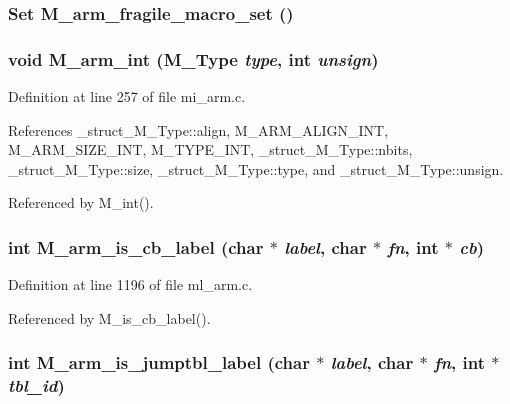 \subsubsection{\setlength{\rightskip}{0pt plus 5cm}\bf{Set} M\_\-arm\_\-fragile\_\-macro\_\-set ()}\label{m__arm_8h_b0a8dfa239893fe6ecf94e3e939766c8}


\subsubsection{\setlength{\rightskip}{0pt plus 5cm}void M\_\-arm\_\-int (\bf{M\_\-Type} {\em type}, int {\em unsign})}\label{m__arm_8h_f9432df5507a52b86271287d4723b72c}




Definition at line 257 of file mi\_\-arm.c.

References \_\-struct\_\-M\_\-Type::align, M\_\-ARM\_\-ALIGN\_\-INT, M\_\-ARM\_\-SIZE\_\-INT, M\_\-TYPE\_\-INT, \_\-struct\_\-M\_\-Type::nbits, \_\-struct\_\-M\_\-Type::size, \_\-struct\_\-M\_\-Type::type, and \_\-struct\_\-M\_\-Type::unsign.

Referenced by M\_\-int().
\subsubsection{\setlength{\rightskip}{0pt plus 5cm}int M\_\-arm\_\-is\_\-cb\_\-label (char $\ast$ {\em label}, char $\ast$ {\em fn}, int $\ast$ {\em cb})}\label{m__arm_8h_2ae88ec8de70409b26b551cb6878b9e4}




Definition at line 1196 of file ml\_\-arm.c.

Referenced by M\_\-is\_\-cb\_\-label().
\subsubsection{\setlength{\rightskip}{0pt plus 5cm}int M\_\-arm\_\-is\_\-jumptbl\_\-label (char $\ast$ {\em label}, char $\ast$ {\em fn}, int $\ast$ {\em tbl\_\-id})}\label{m__arm_8h_a213a4eb3dbb08b56bf8cb926c2f93fc}




